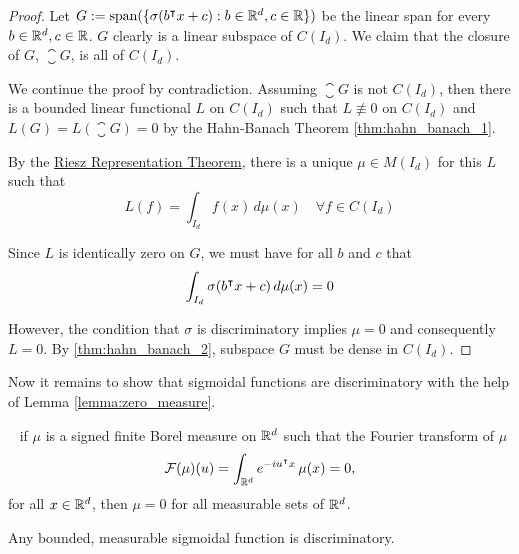 \begin{proof}
    Let $G := \operatorname{span}(\{\sigma(b{}^{\intercal} x + c): b \in \mathbb{R}^d, c \in \mathbb{R} \})$ be the linear
    span for every $b\in\mathbb{R}^d, c\in\mathbb{R}$. $G$ clearly is a linear subspace of
    $C(I_d)$. We claim that the closure of $G$, $\closure{G}$, is all of
    $C(I_d)$.

    We continue the proof by contradiction. Assuming $\closure{G}$ is not
    $C(I_d)$, then there is a bounded linear functional $L$ on $C(I_d)$ such
    that $L \not\equiv 0$ on $C(I_d)$ and $L(G) = L(\closure{G}) = 0$ by the
    Hahn-Banach Theorem \ref{thm:hahn_banach_1}.

    By the \hyperref[thm:riesz_rep]{Riesz Representation Theorem}, there is a
    unique $\mu \in M(I_d)$ for this $L$ such that
    \begin{equation}
        L(f) = \int_{I_d} f(x) \,d\mu(x) \quad \forall f \in C(I_d)
    \end{equation}

    Since $L$ is identically zero on $G$, we must have for all $b$ and $c$ that
    \begin{equation}
        \int_{I_d} \sigma(b{}^{\intercal} x + c) \,d\mu(x) = 0
    \end{equation}

    However, the condition that $\sigma$ is discriminatory implies $\mu = 0$ and
    consequently $L = 0$. By \eqref{thm:hahn_banach_2}, subspace $G$ must be
    dense in $C(I_d)$.
\end{proof}

Now it remains to show that sigmoidal functions are discriminatory with the help
of Lemma \ref{lemma:zero_measure}.

\begin{lemma}~\cite{rudinFunctionalAnalysis1991}
    \label{lemma:zero_measure}
    if $\mu$ is a signed finite Borel measure on $\mathbb{R}^d$ such that the Fourier
    transform of $\mu$
    \begin{equation}
        \mathcal{F}(\mu)(u) = \int_{\mathbb{R}^d} e^{-iu{}^{\intercal} x} \,\mu(x) = 0,  
    \end{equation}
    for all $x\in\mathbb{R}^d$, then $\mu = 0$ for all measurable sets of $\mathbb{R}^d$.
\end{lemma}

\begin{lemma}
    Any bounded, measurable sigmoidal function is discriminatory.
\end{lemma}


